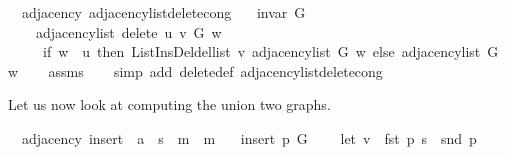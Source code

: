 \begin{isabellebody}
\endisatagproof
{\isafoldproof}%
%
\isadelimproof
\isanewline
%
\endisadelimproof
\isanewline
{}\isamarkupfalse%
\ {\isacharparenleft}{\kern0pt}\ adjacency{\isacharparenright}{\kern0pt}\ adjacency{\isacharunderscore}{\kern0pt}list{\isacharunderscore}{\kern0pt}delete{\isacharprime}{\kern0pt}{\isacharunderscore}{\kern0pt}cong{\isacharcolon}{\kern0pt}\isanewline
\ \ \ {\isachardoublequoteopen}invar\ G{\isachardoublequoteclose}\isanewline
\ \ \isanewline
\ \ \ \ {\isachardoublequoteopen}adjacency{\isacharunderscore}{\kern0pt}list\ {\isacharparenleft}{\kern0pt}delete{\isacharprime}{\kern0pt}\ u\ v\ G{\isacharparenright}{\kern0pt}\ w\ {\isacharequal}{\kern0pt}\isanewline
\ \ \ \ \ {\isacharparenleft}{\kern0pt}if\ w\ {\isacharequal}{\kern0pt}\ u\ then\ List{\isacharunderscore}{\kern0pt}Ins{\isacharunderscore}{\kern0pt}Del{\isachardot}{\kern0pt}del{\isacharunderscore}{\kern0pt}list\ v\ {\isacharparenleft}{\kern0pt}adjacency{\isacharunderscore}{\kern0pt}list\ G\ w{\isacharparenright}{\kern0pt}\ else\ adjacency{\isacharunderscore}{\kern0pt}list\ G\ w{\isacharparenright}{\kern0pt}{\isachardoublequoteclose}\isanewline
%
\isadelimproof
\ \ %
\endisadelimproof
%
\isatagproof
{}\isamarkupfalse%
\ assms\isanewline
\ \ \isamarkupfalse%
\ {\isacharparenleft}{\kern0pt}simp\ add{\isacharcolon}{\kern0pt}\ delete{\isacharprime}{\kern0pt}{\isacharunderscore}{\kern0pt}def\ adjacency{\isacharunderscore}{\kern0pt}list{\isacharunderscore}{\kern0pt}delete{\isacharunderscore}{\kern0pt}cong{\isacharparenright}{\kern0pt}%
\endisatagproof
{\isafoldproof}%
%
\isadelimproof
%
\endisadelimproof
%
\begin{isamarkuptext}%
Let us now look at computing the union two graphs.%
\end{isamarkuptext}\isamarkuptrue%
\isamarkupfalse%
\ {\isacharparenleft}{\kern0pt}\ adjacency{\isacharparenright}{\kern0pt}\ insert{\isacharunderscore}{\kern0pt}{}\ {\isacharcolon}{\kern0pt}{\isacharcolon}{\kern0pt}\ {\isachardoublequoteopen}{\isacharprime}{\kern0pt}a\ {\isasymtimes}\ {\isacharprime}{\kern0pt}s\ {\isasymRightarrow}\ {\isacharprime}{\kern0pt}m\ {\isasymRightarrow}\ {\isacharprime}{\kern0pt}m{\isachardoublequoteclose}\ \isanewline
\ \ {\isachardoublequoteopen}insert{\isacharunderscore}{\kern0pt}{}\ p\ G\ {\isasymequiv}\isanewline
\ \ \ let\ v\ {\isacharequal}{\kern0pt}\ fst\ p{\isacharsemicolon}{\kern0pt}\ s\ {\isacharequal}{\kern0pt}\ snd\ p\isanewline

\end{isabellebody}
